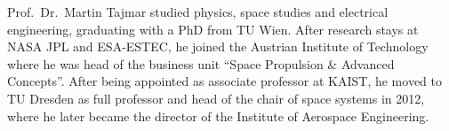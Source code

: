 \documentclass[a4paper,parskip,10pt]{scrartcl}
\begin{document}
\begin{tcolorbox}
        {
            \small
            \color{white!20!black}
            Prof.~Dr.~Martin Tajmar studied physics, space studies and electrical engineering, graduating with a PhD from TU Wien. After research stays at NASA JPL and ESA-ESTEC, he joined the Austrian Institute of Technology where he was head of the business unit ``Space Propulsion \& Advanced Concepts''. After being appointed as associate professor at KAIST, he moved to TU Dresden as full professor and head of the chair of space systems in 2012, where he later became the director of the Institute of Aerospace Engineering.}

        

        \vspace{2ex}
    \end{tcolorbox}
    \vspace{-1ex}

    \vfill
\end{document}
